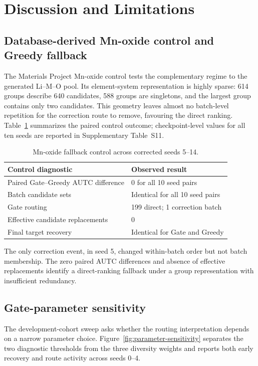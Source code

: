 \section{Discussion and Limitations}

\subsection{Database-derived Mn-oxide control and Greedy fallback}

The Materials Project Mn-oxide control tests the complementary regime to the
generated Li--M--O pool. Its element-system representation is highly sparse:
614 groups describe 640 candidates, 588 groups are singletons, and the largest
group contains only two candidates. This geometry leaves almost no batch-level
repetition for the correction route to remove, favouring the direct ranking.
Table~\ref{tab:mnoxide-control} summarizes the paired control outcome;
checkpoint-level values for all ten seeds are reported in Supplementary
Table~S11.

\begin{table}[!htbp]
\caption{Mn-oxide fallback control across corrected seeds 5--14.}
\label{tab:mnoxide-control}
\centering
\small
\begin{tabular}{@{}ll@{}}
\toprule
Control diagnostic & Observed result \\
\midrule
Paired Gate--Greedy AUTC difference & 0 for all 10 seed pairs \\
Batch candidate sets & Identical for all 10 seed pairs \\
Gate routing & 199 direct; 1 correction batch \\
Effective candidate replacements & 0 \\
Final target recovery & Identical for Gate and Greedy \\
\bottomrule
\end{tabular}
\end{table}

The only correction event, in seed 5, changed within-batch order but not batch
membership. The zero paired AUTC differences and absence of effective
replacements identify a direct-ranking fallback under a group representation
with insufficient redundancy.

\subsection{Gate-parameter sensitivity}

The development-cohort sweep asks whether the routing interpretation depends on
a narrow parameter choice. Figure~\ref{fig:parameter-sensitivity} separates the
two diagnostic thresholds from the three diversity weights and reports both
early recovery and route activity across seeds 0--4.

